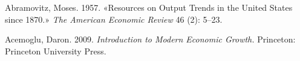 \documentclass[11pt, oneside]{book}
\begin{document}
\begin{thebibliography}{111}






 Abramovitz, Moses. 1957. «Resources on Output Trends in the United States since 1870.» \textit{The American Economic Review} 46 (2): 5–23.

 Acemoglu, Daron. 2009. \textit{Introduction to Modern Economic Growth.} Princeton: Princeton University Press.


























\end{thebibliography}
\end{document}
